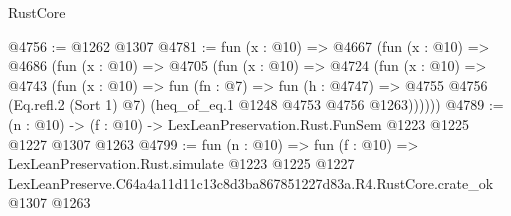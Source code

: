 \begin{lexlean}{RustCore}
\begin{coremodule}
@4756 := @1262 @1307
@4781 := fun (x : @10) =>
  @4667
    (fun (x : @10) =>
    @4686
      (fun (x : @10) =>
      @4705
        (fun (x : @10) =>
        @4724
          (fun (x : @10) =>
          @4743
            (fun (x : @10) =>
            fun (fn : @7) =>
            fun (h : @4747) =>
            @4755 @4756 (Eq.refl.{2} (Sort 1) @7) (heq_of_eq.{1} @1248 @4753 @4756 @1263))))))
@4789 := (n : @10) -> (f : @10) -> LexLeanPreservation.Rust.FunSem @1223 @1225 @1227 @1307 @1263
@4799 := fun (n : @10) =>
  fun (f : @10) =>
  LexLeanPreservation.Rust.simulate
    @1223
    @1225
    @1227
    LexLeanPreserve.C64a4a11d11c13c8d3ba867851227d83a.R4.RustCore.crate_ok
    @1307
    @1263
\end{coremodule}
\end{lexlean}
